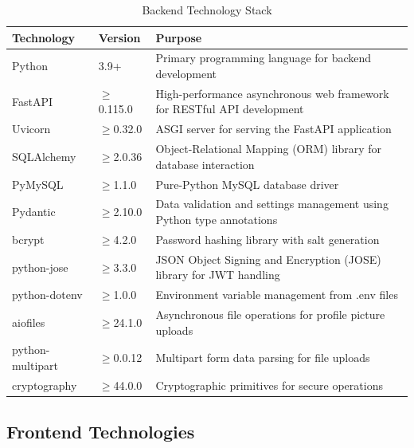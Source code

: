 \begin{table}[H]
  \centering
  \caption{Backend Technology Stack}
  \label{tab:tech-backend}
  \begin{tabularx}{\textwidth}{@{}l l X@{}}
    \toprule
    \textbf{Technology} & \textbf{Version} & \textbf{Purpose} \\
    \midrule
    Python & 3.9+ & Primary programming language for backend development \\
    FastAPI & $\geq$0.115.0 & High-performance asynchronous web framework for RESTful API development \\
    Uvicorn & $\geq$0.32.0 & ASGI server for serving the FastAPI application \\
    SQLAlchemy & $\geq$2.0.36 & Object-Relational Mapping (ORM) library for database interaction \\
    PyMySQL & $\geq$1.1.0 & Pure-Python MySQL database driver \\
    Pydantic & $\geq$2.10.0 & Data validation and settings management using Python type annotations \\
    bcrypt & $\geq$4.2.0 & Password hashing library with salt generation \\
    python-jose & $\geq$3.3.0 & JSON Object Signing and Encryption (JOSE) library for JWT handling \\
    python-dotenv & $\geq$1.0.0 & Environment variable management from .env files \\
    aiofiles & $\geq$24.1.0 & Asynchronous file operations for profile picture uploads \\
    python-multipart & $\geq$0.0.12 & Multipart form data parsing for file uploads \\
    cryptography & $\geq$44.0.0 & Cryptographic primitives for secure operations \\
    \bottomrule
  \end{tabularx}
\end{table}

\subsection{Frontend Technologies}


